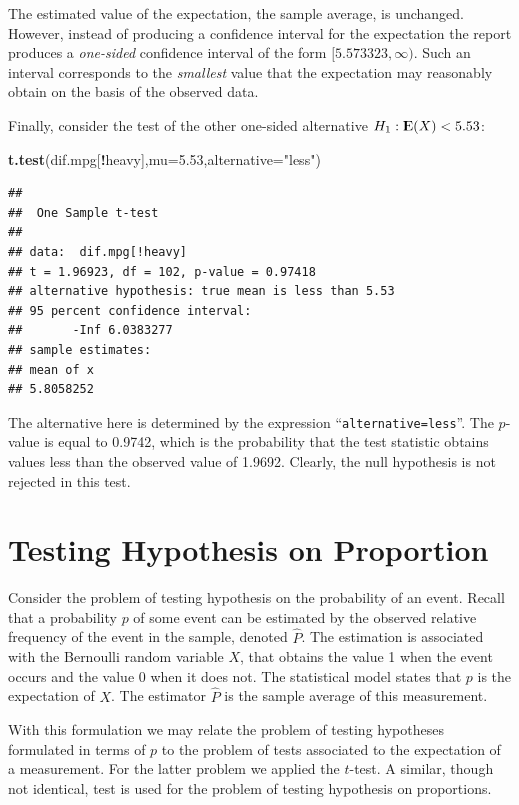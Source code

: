 \documentclass[]{krantz}
\makeatletter
\newenvironment{Shaded}{\begin{snugshade}}{\end{snugshade}}
\newcommand{\DataTypeTok}[1]{\textcolor[rgb]{0.13,0.29,0.53}{#1}}
\newcommand{\FloatTok}[1]{\textcolor[rgb]{0.00,0.00,0.81}{#1}}
\newcommand{\KeywordTok}[1]{\textcolor[rgb]{0.13,0.29,0.53}{\textbf{#1}}}
\newcommand{\NormalTok}[1]{#1}
\newcommand{\OperatorTok}[1]{\textcolor[rgb]{0.81,0.36,0.00}{\textbf{#1}}}
\newcommand{\StringTok}[1]{\textcolor[rgb]{0.31,0.60,0.02}{#1}}
\newcommand{\Expec}{{\rm I\kern-.3em E}}
\newenvironment{kframe}{%
\medskip{}
\setlength{\fboxsep}{.8em}
 \def\at@end@of@kframe{}%
 \ifinner\ifhmode%
  \def\at@end@of@kframe{\end{minipage}}%
  \begin{minipage}{\columnwidth}%
 \fi\fi%
 \def\FrameCommand##1{\hskip\@totalleftmargin \hskip-\fboxsep
 \colorbox{shadecolor}{##1}\hskip-\fboxsep
     \hskip-\linewidth \hskip-\@totalleftmargin \hskip\columnwidth}%
 \MakeFramed {\advance\hsize-\width
   \@totalleftmargin\z@ \linewidth\hsize
   \@setminipage}}%
 {\par\unskip\endMakeFramed%
 \at@end@of@kframe}
\renewenvironment{Shaded}{\begin{kframe}}{\end{kframe}}
\theoremstyle{definition}
\theoremstyle{definition}
\theoremstyle{definition}
\theoremstyle{remark}
\makeatother
\begin{document}
The estimated value of the expectation, the sample average, is
unchanged. However, instead of producing a confidence interval for the
expectation the report produces a \emph{one-sided} confidence interval of the
form \([5.573323, \infty)\). Such an interval corresponds to the
\emph{smallest} value that the expectation may reasonably obtain on the basis
of the observed data.

Finally, consider the test of the other one-sided alternative
\(H_1:\Expec(X) < 5.53\):

\begin{Shaded}
\begin{Highlighting}[]
\KeywordTok{t.test}\NormalTok{(dif.mpg[}\OperatorTok{!}\NormalTok{heavy],}\DataTypeTok{mu=}\FloatTok{5.53}\NormalTok{,}\DataTypeTok{alternative=}\StringTok{"less"}\NormalTok{)}
\end{Highlighting}
\end{Shaded}

\begin{verbatim}
## 
##  One Sample t-test
## 
## data:  dif.mpg[!heavy]
## t = 1.96923, df = 102, p-value = 0.97418
## alternative hypothesis: true mean is less than 5.53
## 95 percent confidence interval:
##       -Inf 6.0383277
## sample estimates:
## mean of x 
## 5.8058252
\end{verbatim}

The alternative here is determined by the expression
``\texttt{alternative=less}''. The \(p\)-value is equal to 0.9742, which is the
probability that the test statistic obtains values less than the
observed value of 1.9692. Clearly, the null hypothesis is not rejected
in this test.

\hypertarget{TestFrac}{%
\section{Testing Hypothesis on Proportion}\label{TestFrac}}

Consider the problem of testing hypothesis on the probability of an
event. Recall that a probability \(p\) of some event can be estimated by
the observed relative frequency of the event in the sample, denoted
\(\hat P\). The estimation is associated with the Bernoulli random
variable \(X\), that obtains the value 1 when the event occurs and the
value 0 when it does not. The statistical model states that \(p\) is the
expectation of \(X\). The estimator \(\hat P\) is the sample average of this
measurement.

With this formulation we may relate the problem of testing hypotheses
formulated in terms of \(p\) to the problem of tests associated to the
expectation of a measurement. For the latter problem we applied the
\(t\)-test. A similar, though not identical, test is used for the problem
of testing hypothesis on proportions.
\end{document}
